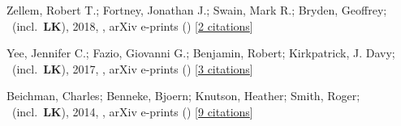 \item[{\color{numcolor}\scriptsize3}] Zellem, Robert T.; Fortney, Jonathan J.; Swain, Mark R.; Bryden, Geoffrey; \etal\ (incl.\ \textbf{LK}), 2018, , arXiv e-prints () [\href{https://ui.adsabs.harvard.edu/abs/2018arXiv180307163Z}{2 citations}]

\item[{\color{numcolor}\scriptsize2}] Yee, Jennifer C.; Fazio, Giovanni G.; Benjamin, Robert; Kirkpatrick, J. Davy; \etal\ (incl.\ \textbf{LK}), 2017, , arXiv e-prints () [\href{https://ui.adsabs.harvard.edu/abs/2017arXiv171004194Y}{3 citations}]

\item[{\color{numcolor}\scriptsize1}] Beichman, Charles; Benneke, Bjoern; Knutson, Heather; Smith, Roger; \etal\ (incl.\ \textbf{LK}), 2014, , arXiv e-prints () [\href{https://ui.adsabs.harvard.edu/abs/2014arXiv1411.1754B}{9 citations}]